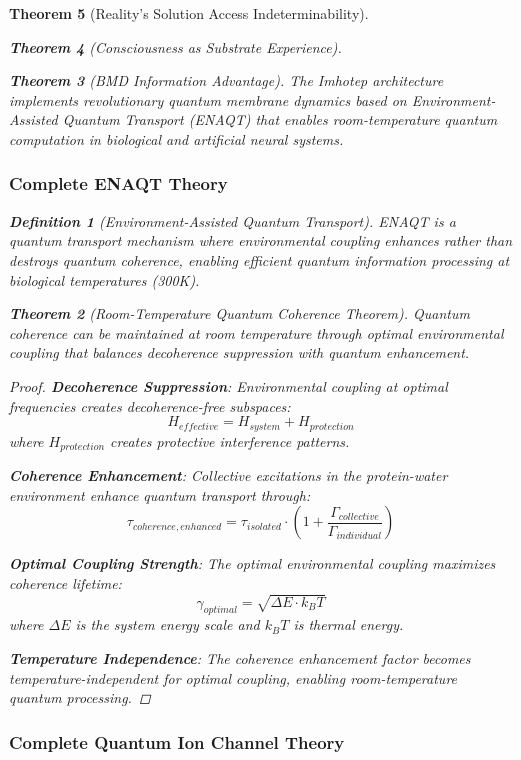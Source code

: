 \documentclass[12pt,a4paper]{article}
\newtheorem{theorem}{Theorem}[section]
\newtheorem{definition}[theorem]{Definition}
\theoremstyle{remark}
\begin{document}
\begin{theorem}[Reality's Solution Access Indeterminability]
\begin{theorem}[Consciousness as Substrate Experience]
\begin{theorem}[BMD Information Advantage]
The Imhotep architecture implements revolutionary quantum membrane dynamics based on Environment-Assisted Quantum Transport (ENAQT) that enables room-temperature quantum computation in biological and artificial neural systems.

\subsubsection{Complete ENAQT Theory}

\begin{definition}[Environment-Assisted Quantum Transport]
ENAQT is a quantum transport mechanism where environmental coupling enhances rather than destroys quantum coherence, enabling efficient quantum information processing at biological temperatures (300K).
\end{definition}

\begin{theorem}[Room-Temperature Quantum Coherence Theorem]
Quantum coherence can be maintained at room temperature through optimal environmental coupling that balances decoherence suppression with quantum enhancement.
\end{theorem}

\begin{proof}
\textbf{Decoherence Suppression}: Environmental coupling at optimal frequencies creates decoherence-free subspaces:
$$H_{effective} = H_{system} + H_{protection}$$
where $H_{protection}$ creates protective interference patterns.

\textbf{Coherence Enhancement}: Collective excitations in the protein-water environment enhance quantum transport through:
$$\tau_{coherence,enhanced} = \tau_{isolated} \cdot \left(1 + \frac{\Gamma_{collective}}{\Gamma_{individual}}\right)$$

\textbf{Optimal Coupling Strength}: The optimal environmental coupling maximizes coherence lifetime:
$$\gamma_{optimal} = \sqrt{\Delta E \cdot k_B T}$$
where $\Delta E$ is the system energy scale and $k_B T$ is thermal energy.

\textbf{Temperature Independence}: The coherence enhancement factor becomes temperature-independent for optimal coupling, enabling room-temperature quantum processing.
\end{proof}

\subsubsection{Complete Quantum Ion Channel Theory}


\end{theorem}
\end{theorem}
\end{theorem}
\end{document}
